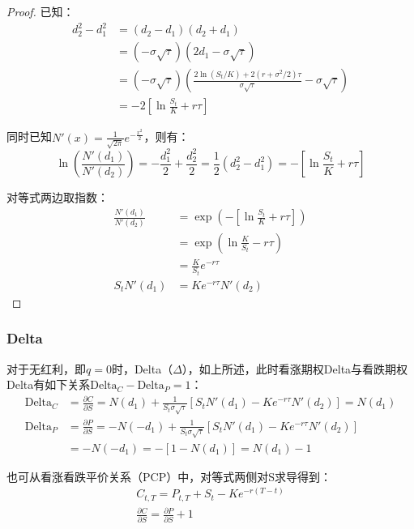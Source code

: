\documentclass[11pt]{article}
\begin{document}
\begin{proof}
    已知：
    \begin{align*}
        d_2^2-d_1^2 &= (d_2-d_1)(d_2+d_1) \\
        &= (-\sigma\sqrt{\tau})(2d_1-\sigma\sqrt{\tau}) \\
        &= (-\sigma\sqrt{\tau})\left(\frac{2\ln(S_t/K) + 2(r+\sigma^2/2)\tau}{\sigma\sqrt{\tau}} -\sigma\sqrt{\tau}\right) \\
        &= -2\left[\ln\frac{S_t}{K}+r\tau\right]
    \end{align*}

    同时已知$N'(x)=\frac{1}{\sqrt{2\pi}} e^{-\frac{x^2}{2}}$，则有：
    \begin{equation*}
        \ln\left(\frac{N'(d_1)}{N'(d_2)}\right)
        = -\frac{d_1^2}{2} + \frac{d_2^2}{2}
        = \frac{1}{2} (d_2^2-d_1^2)
        = -\left[\ln\frac{S_t}{K} +r\tau\right]
    \end{equation*}

    对等式两边取指数：
    \begin{align*}
        \frac{N'(d_1)}{N'(d_2)} 
        &= \exp\left( -\left[\ln\frac{S_t}{K} +r\tau\right] \right) \\
        &= \exp \left( \ln\frac{K}{S_t}-r\tau \right) \\
        &= \frac{K}{S_t} e^{-r\tau} \\
        S_t N'(d_1) &= Ke^{-r\tau} N'(d_2)
    \end{align*}
\end{proof}

\subsubsection{Delta}

对于无红利，即$q=0$时，Delta（$\Delta$），如上所述，此时看涨期权Delta与看跌期权Delta有如下关系$\text{Delta}_C - \text{Delta}_P = 1$：
\begin{align*}
    \text{Delta}_C &= \frac{\partial C}{\partial S}
    = N(d_1) + \frac{1}{S_t\sigma\sqrt{\tau}} \left[ S_t N'(d_1)-Ke^{-r\tau}N'(d_2) \right] = N(d_1) \\
    \text{Delta}_P &= \frac{\partial P}{\partial S}
    = -N(-d_1) + \frac{1}{S_t\sigma\sqrt{\tau}} \left[ S_t N'(d_1)-Ke^{-r\tau}N'(d_2) \right] \\
    &= -N(-d_1) = -\left[ 1- N(d_1) \right] = N(d_1)-1
\end{align*}

也可从看涨看跌平价关系（PCP）中，对等式两侧对S求导得到：
\begin{gather*}
    C_{t,T} = P_{t,T} +  S_t - K e^{-r(T-t)} \\
    \frac{\partial C}{\partial S} = \frac{\partial P}{\partial S} + 1
\end{gather*}
\end{document}
